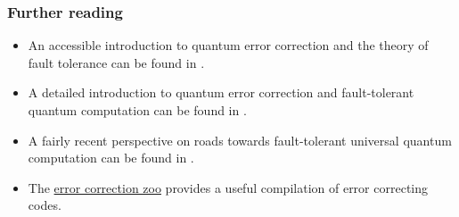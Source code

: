 \begin{refsection}

\subsubsection*{Further reading}
\begin{itemize}
    \item An accessible introduction to quantum error correction and the theory of fault tolerance can be found in  \cite{raussendorf2012KeyIdeasQEC}.
    \item A detailed introduction to quantum error correction and fault-tolerant quantum computation can be found in  \cite{gottesman2010introduction}.
    \item A fairly recent perspective on roads towards fault-tolerant universal quantum computation can be found in  \cite{campbell2017RoadsTowardFTQC}.
    \item The \href{https://errorcorrectionzoo.org/}{error correction zoo} provides a useful compilation of error correcting codes.
\end{itemize}

\printbibliography[heading=secbib,segment=\therefsegment]

\end{refsection}



\newpage



